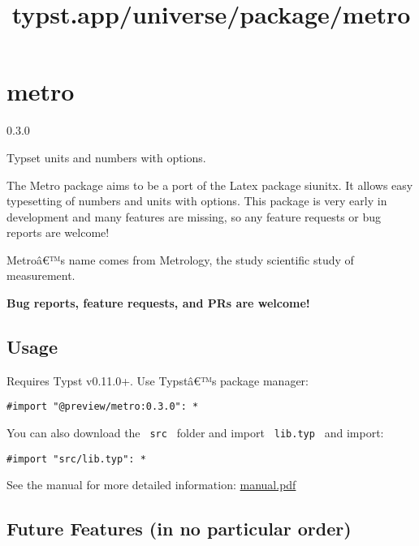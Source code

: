 \title{typst.app/universe/package/metro}

\label{banner}
\section{metro}\label{metro}

{ 0.3.0 }

Typset units and numbers with options.

\label{readme}
The Metro package aims to be a port of the Latex package siunitx. It
allows easy typesetting of numbers and units with options. This package
is very early in development and many features are missing, so any
feature requests or bug reports are welcome!

Metroâ€™s name comes from Metrology, the study scientific study of
measurement.

\textbf{Bug reports, feature requests, and PRs are welcome!}

\subsection{Usage}\label{usage}

Requires Typst v0.11.0+. Use Typstâ€™s package manager:

\begin{verbatim}
#import "@preview/metro:0.3.0": *
\end{verbatim}

You can also download the \texttt{\ src\ } folder and import
\texttt{\ lib.typ\ } and import:

\begin{verbatim}
#import "src/lib.typ": *
\end{verbatim}

See the manual for more detailed information:
\href{https://github.com/typst/packages/raw/main/packages/preview/metro/0.3.0/manual.pdf}{manual.pdf}

\subsection{Future Features (in no particular
order)}\label{future-features-in-no-particular-order}

